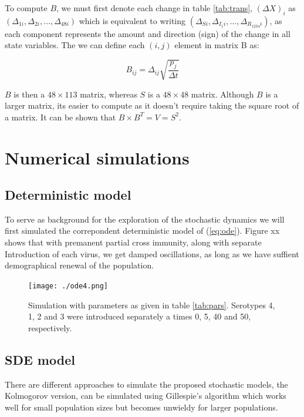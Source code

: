 \documentclass[12pt]{article}
\begin{document}
To compute $B$, we must first denote each change in table \ref{tab:trans}, 
$(\Delta X)_i$ as $(\Delta_{1i}, \Delta_{2i}, \ldots, \Delta_{48i})$ which is 
equivalent to writing $(\Delta_{Si}, \Delta_{I_1i}, \ldots, 
\Delta_{R_{1234}i})$, as each component represents the amount and direction 
(sign)  of the change in all state variables. The we can define each $(i,j)$ 
element in matrix B as:

\begin{equation}
 B_{ij} = \Delta_{ij}\sqrt{\frac{p_j}{\Delta t}}
\end{equation}

$B$ is then a $48 \times 113$ matrix, whereas $S$ is a $48 \times 48$ matrix. 
Although $B$ is a larger matrix, its easier to compute as it doesn't require 
taking the square root of a matrix. It can be shown that $B\times B^T = V = 
S^2$.

%


\section*{Numerical simulations}

\subsection*{Deterministic model}

To serve as background for the exploration of the stochastic dynamics we  will 
first simulated the correpondent deterministic model of (\ref{eq:ode}). Figure 
xx shows that with premanent partial cross immunity, along with separate 
Introduction of each virus, we get damped oscillations, as long as we have 
suffient demographical renewal of the population.

\begin{figure}
 \centering
 \texttt{[image: ./ode4.png]}
 \caption{Simulation with parameters as given in table \ref{tab:pars}. 
Serotypes 4, 1, 2 and 3 were introduced separately a times 0, 5, 40 and 50, 
respectively.}
 \label{fig:ode4}
\end{figure}



\subsection*{SDE model}
There are different approaches to simulate the proposed stochastic  models, the 
Kolmogorov version, can be simulated using Gillespie's algorithm which works 
well for small population sizes but becomes unwieldy for larger populations. 
\end{document}
